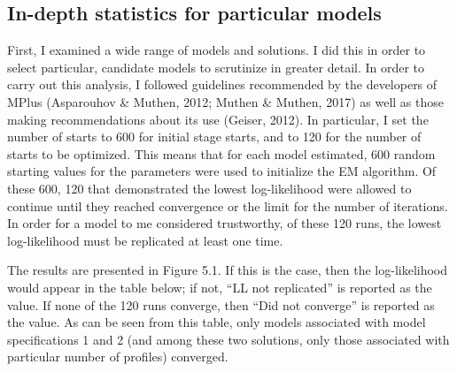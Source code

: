 \documentclass[]{book}
\theoremstyle{definition}
\theoremstyle{definition}
\theoremstyle{definition}
\theoremstyle{remark}
\begin{document}
\subsection{In-depth statistics for particular
models}\label{in-depth-statistics-for-particular-models}

First, I examined a wide range of models and solutions. I did this in
order to select particular, candidate models to scrutinize in greater
detail. In order to carry out this analysis, I followed guidelines
recommended by the developers of MPlus (Asparouhov \& Muthen, 2012;
Muthen \& Muthen, 2017) as well as those making recommendations about
its use (Geiser, 2012). In particular, I set the number of starts to 600
for initial stage starts, and to 120 for the number of starts to be
optimized. This means that for each model estimated, 600 random starting
values for the parameters were used to initialize the EM algorithm. Of
these 600, 120 that demonstrated the lowest log-likelihood were allowed
to continue until they reached convergence or the limit for the number
of iterations. In order for a model to me considered trustworthy, of
these 120 runs, the lowest log-likelihood must be replicated at least
one time.

The results are presented in Figure 5.1. If this is the case, then the
log-likelihood would appear in the table below; if not, ``LL not
replicated'' is reported as the value. If none of the 120 runs converge,
then ``Did not converge'' is reported as the value. As can be seen from
this table, only models associated with model specifications 1 and 2
(and among these two solutions, only those associated with particular
number of profiles) converged.
\end{document}
